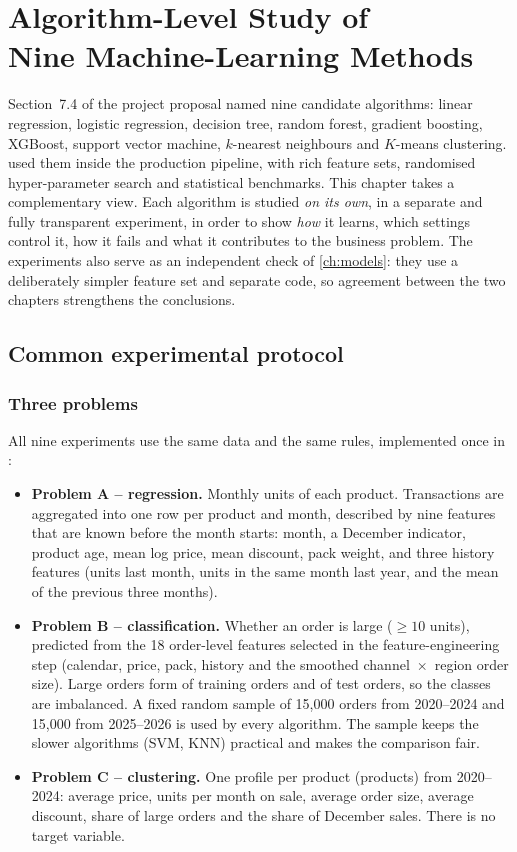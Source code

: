 \chapter[Algorithm-Level Study of Nine ML Methods]{Algorithm-Level Study of\\ Nine Machine-Learning Methods}\label{ch:algorithms}

Section~7.4 of the project proposal named nine candidate algorithms: linear regression, logistic regression,
decision tree, random forest, gradient boosting, XGBoost, support vector machine, $k$-nearest neighbours and
$K$-means clustering.  used them inside the production pipeline, with rich feature sets,
randomised hyper-parameter search and statistical benchmarks. This chapter takes a complementary view. Each
algorithm is studied \emph{on its own}, in a separate and fully transparent experiment, in order to show
\emph{how} it learns, which settings control it, how it fails and what it contributes to the business problem.
The experiments also serve as an independent check of \cref{ch:models}: they use a deliberately simpler feature
set and separate code, so agreement between the two chapters strengthens the conclusions.

\section{Common experimental protocol}\label{sec:algoprotocol}
\subsection{Three problems}
All nine experiments use the same data and the same rules, implemented once in
:
\begin{itemize}
  \item \textbf{Problem A -- regression.} Monthly units of each product. Transactions are aggregated into one row
        per product and month, described by nine features that are known before the month starts: month, a
        December indicator, product age, mean log price, mean discount, pack weight, and three history features
        (units last month, units in the same month last year, and the mean of the previous three months).
  \item \textbf{Problem B -- classification.} Whether an order is large ($\geq 10$ units), predicted from the 18
        order-level features selected in the feature-engineering step (calendar, price, pack, history and the
        smoothed channel~$\times$~region order size). Large orders form \LargeShareTrain of training orders and
        \LargeShareTest of test orders, so the classes are imbalanced. A fixed random sample of 15,000 orders
        from 2020--2024 and 15,000 from 2025--2026 is used by every algorithm. The sample keeps the slower
        algorithms (SVM, KNN) practical and makes the comparison fair.
  \item \textbf{Problem C -- clustering.} One profile per product (\KMProducts products) from 2020--2024: average
        price, units per month on sale, average order size, average discount, share of large orders and the
        share of December sales. There is no target variable.
\end{itemize}

